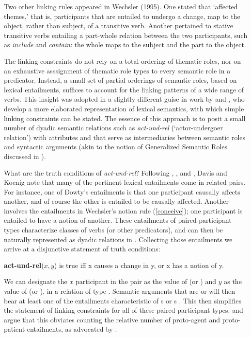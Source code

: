 \documentclass[output=paper]{langsci/langscibook}
\begin{document}
Two other linking rules appeared in Wechsler (1995).  One stated that `affected themes,' that is, participants that are entailed to undergo a change, map to the object, rather than subject, of a transitive verb.  Another pertained to stative transitive verbs entailing a part-whole relation between the two participants, such as \textit{include} and \textit{contain}: the whole maps to the subject and the part to the object.   

The linking constraints do not rely on a total ordering of thematic roles, nor on an exhaustive asssignment of thematic role types to every semantic role in a predicator. Instead, a small set of partial orderings of semantic roles, based on lexical entailments, suffices to account for the linking patterns of a wide range of verbs. 
This insight was adopted in a slightly different guise in work by \citet{Davis1996,Davis2001} and \cite{DavisandKoenig2000b}, who develop a more elaborated representation of lexical semantics, with which simple linking constraints can be stated.
The essence of this approach is to posit a small number of dyadic semantic relations such as \textit{act-und-rel} (`actor-undergoer relation') with attributes   and  that serve as intermediaries between semantic roles and syntactic arguments (akin to the notion of Generalized Semantic Roles discussed in \citealt{VanValin1999}).  

What are the truth conditions of \textit{act-und-rel}?  
Following \citet{Fillmore1977}, \citet{Dowty91a}, and \citet{Wechsler1995b}, Davis and Koenig note that many of the pertinent lexical entailments come in related pairs.
For instance, one of Dowty's entailments is that one participant causally affects another, and of course the other is entailed to be causally affected.
Another involves the entailments in Wechsler's notion rule (\ref{conceive}); one participant is entailed to have a notion of another. 
These entailments of paired participant types characterize classes of verbs (or other predicators), and can then be naturally represented as dyadic relations in .  Collecting those entailments we arrive at a disjunctive statement of truth conditions:

\begin{exe}
\ex \textbf{act-und-rel}($x,y$) is true iff x causes a change in y, or x has a notion of y.
\end{exe}

\noindent
We can designate the $x$ participant  in the pair as the value of  (or ) and $y$ as the value of  (or ), in a relation of type .   Semantic arguments that are  or  will then bear at least one of the entailments characteristic of s or s \citep[72]{DavisandKoenig2000b}. This then simplifies the statement of linking constraints for all of these paired participant types.
\citet{Davis1996} and \citet{KoenigandDavis2001} argue that this obviates counting the relative number of proto-agent and proto-patient entailments, as advocated by \citet{Dowty91a}.
\end{document}
